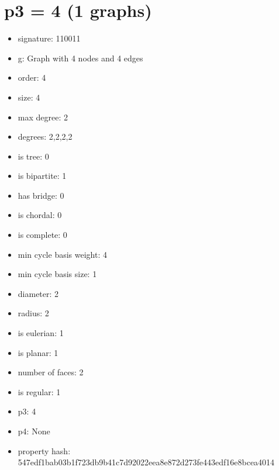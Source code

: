 \chapter{p3 = 4 (1 graphs)}
\newpage\begin{figure}
\end{figure}
\begin{itemize}
\item signature: 110011
\item g: Graph with 4 nodes and 4 edges
\item order: 4
\item size: 4
\item max degree: 2
\item degrees: 2,2,2,2
\item is tree: 0
\item is bipartite: 1
\item has bridge: 0
\item is chordal: 0
\item is complete: 0
\item min cycle basis weight: 4
\item min cycle basis size: 1
\item diameter: 2
\item radius: 2
\item is eulerian: 1
\item is planar: 1
\item number of faces: 2
\item is regular: 1
\item p3: 4
\item p4: None
\item property hash: 547edf1bab03b1f723db9b41c7d92022eea8e872d273fe443edf16e8bcea4014
\end{itemize}
\newpage
